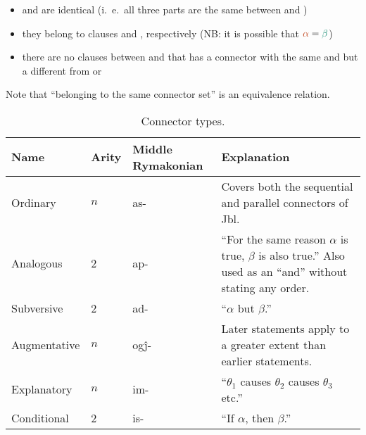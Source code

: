 \documentclass{book}
\newcommand{\lname}{Middle Rymakonian}
\begin{document}
\begin{itemize}
  \item {} and  are identical (i.~e.~all three parts are the same between  and )
  \item they belong to clauses \hlv{$\alpha$} and \hlvi{$\beta$}, respectively (NB: it is possible that $\hlv{\alpha} = \hlvi{\beta}$)
  \item there are no clauses between \hlv{$\alpha$} and \hlvi{$\beta$} that has a connector with the same  and  but a different  from  or 
\end{itemize}

Note that ``belonging to the same connector set'' is an equivalence relation.

\begin{table}[ht]
  \caption{Connector types. \label{table:contypes}}
  \centering
  \begin{tabu} to 
    Name & Arity & \textnormal{\lname} & Explanation \\
    \hline
    Ordinary & $n$ & as- & Covers both the sequential and parallel connectors of Jbl. \\
    Analogous & 2 & ap- & ``For the same reason $\alpha$ is true, $\beta$ is also true.'' Also used as an ``and'' without stating any order. \\
    Subversive & 2 & ad- & ``$\alpha$ but $\beta$.'' \\
    Augmentative & $n$ & og\^j- & Later statements apply to a greater extent than earlier statements. \\
    Explanatory & $n$ & im- & ``$\theta_1$ causes $\theta_2$ causes $\theta_3$ etc.'' \\
    Conditional & 2 & is- & ``If $\alpha$, then $\beta$.'' \\
  \end{tabu}
\end{table}
\end{document}

